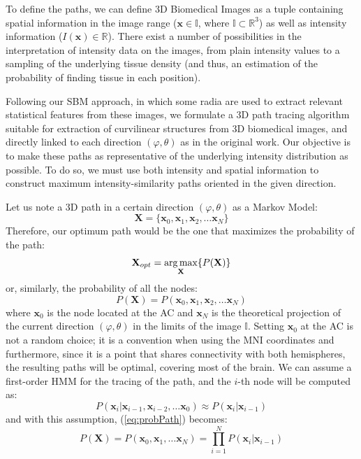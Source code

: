 To define the paths, we can define 3D Biomedical Images as a tuple containing spatial information in the image range ($\mathbf{x} \in \mathbb{I}$, where $\mathbb{I}\subset \mathbb{R}^3$) as well as intensity information ($I(\mathbf{x}) \in \mathbb{R}$). There exist a number of possibilities in the interpretation of intensity data on the images, from plain intensity values to a sampling of the underlying tissue density (and thus, an estimation of the probability of finding tissue in each position). 

Following our \ac{SBM} approach, in which some radia are used to extract relevant statistical features from these images, we formulate a 3D path tracing algorithm suitable for extraction of curvilinear structures from 3D biomedical images, and directly linked to each direction $(\varphi,\theta)$ as in the original work. Our objective is to make these paths as representative of the underlying intensity distribution as possible. To do so, we must use both intensity and spatial information to construct maximum intensity-similarity paths oriented in the given direction. 

Let us note a 3D path in a certain direction $(\varphi,\theta)$ as a Markov Model\cite{Chen2008}: 
\begin{equation}
\mathbf{X} = \{\mathbf{x}_0, \mathbf{x}_1, \mathbf{x}_2, \dots \mathbf{x}_N\}
\end{equation}
Therefore, our optimum path would be the one that maximizes the probability of the path:
\begin{equation}\label{eq:optimalPath}
\mathbf{X}_{opt} = \operatorname*{arg\,max}_\mathbf{X} \{P(\mathbf{X})\}
\end{equation}
or, similarly, the probability of all the nodes:
\begin{equation}\label{eq:probPath}
P(\mathbf{X}) = P(\mathbf{x}_0, \mathbf{x}_1, \mathbf{x}_2, \dots \mathbf{x}_N)
\end{equation}
where $\mathbf{x}_0$ is the node located at the AC and $\mathbf{x}_N$ is the theoretical projection of the current direction $(\varphi,\theta)$ in the limits of the image $\mathbb{I}$. Setting $\mathbf{x}_0$ at the AC is not a random choice; it is a convention when using the \ac{MNI} coordinates\cite{Evans1993} and furthermore, since it is a point that shares connectivity with both hemispheres, the resulting paths will be optimal, covering most of the brain. We can assume a first-order \acf{HMM} for the tracing of the path, and the $i$-th node will be computed as:
\begin{equation}
P(\mathbf{x}_i | \mathbf{x}_{i-1}, \mathbf{x}_{i-2}, \dots \mathbf{x}_0) \approx P(\mathbf{x}_i|\mathbf{x}_{i-1})
\end{equation}
and with this assumption, (\ref{eq:probPath}) becomes:
\begin{equation}
P(\mathbf{X}) = P(\mathbf{x}_0, \mathbf{x}_1, \dots \mathbf{x}_N) = \prod_{i=1}^{N} P(\mathbf{x}_i|\mathbf{x}_{i-1})
\end{equation} 

